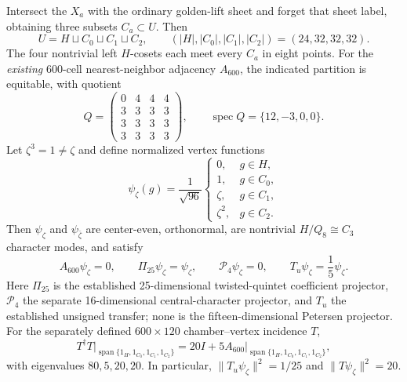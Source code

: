 \documentclass[11pt]{article}
\begin{document}
\begin{theorem}
\label{p1:thm:v370-e8-shell-chamber}
Intersect the $X_a$ with the ordinary golden-lift sheet and forget that
sheet label, obtaining three subsets $C_a\subset U$.  Then
\[
 U=H\sqcup C_0\sqcup C_1\sqcup C_2,
 \qquad(|H|,|C_0|,|C_1|,|C_2|)=(24,32,32,32).
\]
The four nontrivial left $H$-cosets each meet every $C_a$ in eight points.
For the \emph{existing} 600-cell nearest-neighbor adjacency
$A_{600}$, the indicated partition is equitable, with quotient
\[
 Q=\begin{pmatrix}
 0&4&4&4\\3&3&3&3\\3&3&3&3\\3&3&3&3
 \end{pmatrix},\qquad
 \operatorname{spec}Q=\{12,-3,0,0\}.
\]
Let $\zeta^3=1\ne\zeta$ and define normalized vertex functions
\[
 \psi_{\zeta}(g)=\frac1{\sqrt{96}}
 \begin{cases}
 0,&g\in H,\\1,&g\in C_0,\\\zeta,&g\in C_1,\\
 \zeta^2,&g\in C_2.
 \end{cases}
\]
Then $\psi_\zeta$ and $\psi_{\bar\zeta}$ are center-even, orthonormal,
are nontrivial $H/Q_8\cong C_3$ character modes, and satisfy
\[
 A_{600}\psi_\zeta=0,\qquad
 \Pi_{25}\psi_\zeta=\psi_\zeta,\qquad
 \mathscr P_4\psi_\zeta=0,\qquad
 T_u\psi_\zeta=\frac15\psi_\zeta.
\]
Here $\Pi_{25}$ is the established 25-dimensional twisted-quintet
coefficient projector, $\mathscr P_4$ the separate 16-dimensional
central-character projector, and $T_u$ the established unsigned transfer;
none is the fifteen-dimensional Petersen projector.  For the separately
defined $600\times120$ chamber--vertex incidence $T$,
\[
 T^\dagger T\big|_{\operatorname{span}\{1_H,1_{C_0},1_{C_1},1_{C_2}\}}
 =20I+5A_{600}\big|_{\operatorname{span}\{1_H,1_{C_0},1_{C_1},1_{C_2}\}},
\]
with eigenvalues $80,5,20,20$.  In particular,
$\|T_u\psi_\zeta\|^2=1/25$ and $\|T\psi_\zeta\|^2=20$.
\end{theorem}
\end{document}
